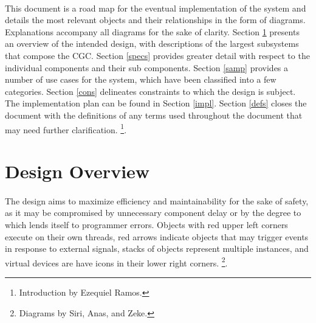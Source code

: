 \documentclass[12pt]{article}
\begin{document}
\paragraph{} This document is a road map for the eventual implementation of the system and details the most 
relevant objects and their relationships in the form of diagrams. Explanations accompany all diagrams for the sake of clarity.
Section \ref{over} presents an overview of the intended design, with descriptions of the largest subsystems that compose the CGC. 
Section \ref{specs} provides greater detail with respect to the individual components and their sub components. Section \ref{samp} 
provides a number of use cases for the system, which have been classified into a few categories. Section \ref{cons} delineates 
constraints to which the design is subject. The implementation plan can be found in Section \ref{impl}. Section \ref{defs} closes the document with the definitions of any terms used throughout the document that may need further clarification.
\footnote{Introduction by Ezequiel Ramos.}.

\section{Design Overview} \label{over}
\paragraph{} The design aims to maximize efficiency and maintainability for the sake of
safety, as it may be compromised by unnecessary component delay or by the degree to which 
lends itself to programmer errors. Objects with red upper left corners execute on their own threads, 
red arrows indicate objects that may trigger events in response to external signals, stacks of objects 
represent multiple instances, and virtual devices are have icons in their lower right corners. 
\footnote{Diagrams by Siri, Anas, and Zeke.}.
\end{document}
